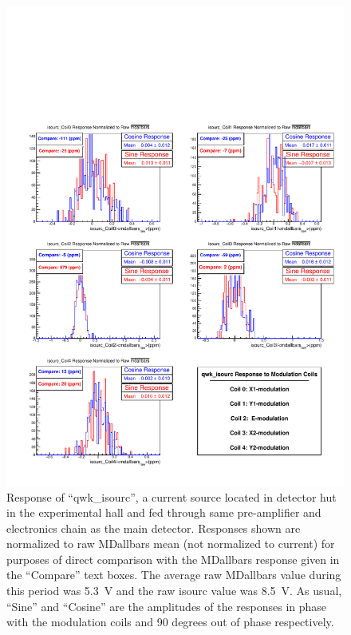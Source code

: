 \begin{figure}[ht]
\centering
\includegraphics[width=6in]{./Pictures/isourc_coeff.pdf}
\caption{\label{fig:isourc}Response of ``qwk\_isourc'', a current source located in detector hut in the experimental hall and fed through same pre-amplifier and electronics chain as the main detector. Responses shown are normalized to raw MDallbars mean (not normalized to current) for purposes of direct comparison with the MDallbars response given in the ``Compare'' text boxes. The average raw MDallbars value during this period was 5.3~V and the raw isourc value was 8.5~V. As usual, ``Sine'' and ``Cosine'' are the amplitudes of the responses in phase with the modulation coils and 90 degrees out of phase respectively.}
\end{figure}
